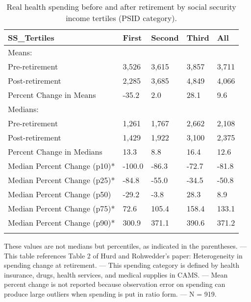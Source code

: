 \begin{table}[tbp] \centering
{}

\caption{Real health spending before and after retirement by social security income tertiles (PSID category).}
\begin{tabularx}{\textwidth}{lCCCC}

\toprule
{SS\_Tertiles}&{First}&{Second}&{Third}&{All} \tabularnewline
\midrule\addlinespace[1.5ex]
Means:&&&& \tabularnewline
\midrule Pre-retirement&3,526&3,615&3,857&3,711 \tabularnewline
Post-retirement&2,285&3,685&4,849&4,066 \tabularnewline
Percent Change in Means&-35.2&2.0&28.1&9.6 \tabularnewline
\midrule Medians:&&&& \tabularnewline
\midrule Pre-retirement&1,261&1,767&2,662&2,108 \tabularnewline
Post-retirement&1,429&1,922&3,100&2,375 \tabularnewline
Percent Change in Medians&13.3&8.8&16.4&12.6 \tabularnewline
Median Percent Change (p10)*&-100.0&-86.3&-72.7&-81.8 \tabularnewline
Median Percent Change (p25)*&-84.8&-55.0&-34.5&-50.8 \tabularnewline
Median Percent Change (p50)&-29.2&-3.8&28.3&8.9 \tabularnewline
Median Percent Change (p75)*&72.6&105.4&158.4&133.1 \tabularnewline
Median Percent Change (p90)*&300.9&371.1&390.6&371.2 \tabularnewline
\bottomrule \addlinespace[1.5ex]

\end{tabularx}
\begin{flushleft}
\footnotesize *These values are not medians but percentiles, as indicated in the parentheses. \linebreak --- \linebreak This table references Table 2 of Hurd and Rohwedder's paper: Heterogeneity in spending change at retirement. \linebreak --- \linebreak This spending category is defined by health insurance, drugs, health services, and medical supplies in CAMS. \linebreak --- \linebreak Mean percent change is not reported because observation error on spending can produce large outliers when spending is put in ratio form. \linebreak --- \linebreak N = 919.
\end{flushleft}
\end{table}
